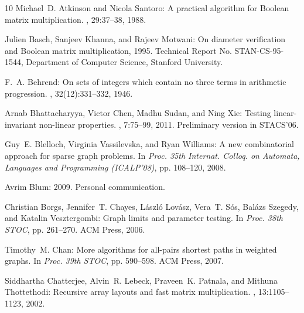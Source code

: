 \begin{thebibliography}{10}
{\sc Michael~D. Atkinson and Nicola Santoro}: A practical algorithm for
  {B}oolean matrix multiplication.
, 29:37--38, 1988.
\newblock [\epfmtdoi{10.1016/0020-0190(88)90130-5}]

{\sc Julien Basch, Sanjeev Khanna, and Rajeev Motwani}: On diameter
  verification and {B}oolean matrix multiplication, 1995.
\newblock Technical Report No. STAN-CS-95-1544, Department of Computer Science,
  Stanford University.

{\sc F.~A. Behrend}: On sets of integers which contain no three terms in
  arithmetic progression.
, 32(12):331--332, 1946.

{\sc Arnab Bhattacharyya, Victor Chen, Madhu Sudan, and Ning Xie}: Testing
  linear-invariant non-linear properties.
, 7:75--99, 2011.
\newblock Preliminary version in STACS'06.

{\sc Guy~E. Blelloch, Virginia Vassilevska, and Ryan Williams}: A new
  combinatorial approach for sparse graph problems.
\newblock In {\em Proc. 35th Internat. Colloq. on Automata, Languages and
  Programming (ICALP'08)}, pp. 108--120, 2008.
\newblock [\epfmtdoi{10.1007/978-3-540-70575-8\_10}]

{\sc Avrim Blum}: 2009.
\newblock Personal communication.

{\sc Christian Borgs, Jennifer~T. Chayes, L{\'a}szl{\'o} Lov{\'a}sz, Vera~T.
  S{\'o}s, Bal{\'a}zs Szegedy, and Katalin Vesztergombi}: Graph limits and
  parameter testing.
\newblock In {\em Proc. 38th STOC}, pp. 261--270. ACM Press, 2006.
\newblock [\epfmtdoi{10.1145/1132516.1132556}]

{\sc Timothy~M. Chan}: More algorithms for all-pairs shortest paths in weighted
  graphs.
\newblock In {\em Proc. 39th STOC}, pp. 590--598. ACM Press, 2007.
\newblock [\epfmtdoi{10.1145/1250790.1250877}]

{\sc Siddhartha Chatterjee, Alvin~R. Lebeck, Praveen~K. Patnala, and Mithuna
  Thottethodi}: Recursive array layouts and fast matrix multiplication.
, 13:1105--1123,
  2002.


\end{thebibliography}
